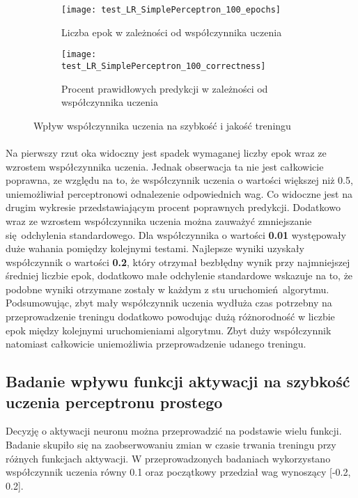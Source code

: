 \documentclass[\main/main.tex]{subfiles}
\begin{document}
    \begin{figure}[H]
    \centering
    \begin{subfigure}{.5\textwidth}
    \centering
    \texttt{[image: test\_LR\_SimplePerceptron\_100\_epochs]}
    \caption{Liczba epok w zależności od współczynnika uczenia}
    \label{fig:lr_sp_epochs}
    \end{subfigure}%
    \begin{subfigure}{.5\textwidth}
    \centering
    \texttt{[image: test\_LR\_SimplePerceptron\_100\_correctness]}
    \caption{Procent prawidłowych predykcji w zależności od współczynnika uczenia}
    \label{fig:lr_sp_correctness}
    \end{subfigure}
    \caption{Wpływ współczynnika uczenia na szybkość i jakość treningu}
    \label{fig:test}
    \end{figure}
    
    \paragraph{}
    Na pierwszy rzut oka widoczny jest spadek wymaganej liczby epok wraz ze wzrostem współczynnika uczenia. Jednak obserwacja ta nie jest całkowicie poprawna, ze względu na to, że współczynnik uczenia o wartości większej niż 0.5, uniemożliwiał perceptronowi odnalezenie odpowiednich wag. Co widoczne jest na drugim wykresie przedstawiającym procent poprawnych predykcji. Dodatkowo wraz ze wzrostem współczynnika uczenia można zauważyć zmniejszanie się odchylenia standardowego. Dla współczynnika o wartości \textbf{0.01} występowały duże wahania pomiędzy kolejnymi testami. Najlepsze wyniki uzyskały współczynnik o wartości \textbf{0.2}, który otrzymał bezbłędny wynik przy najmniejszej średniej liczbie epok, dodatkowo małe odchylenie standardowe  wskazuje na to, że podobne wyniki otrzymane zostały w każdym z stu uruchomień algorytmu. Podsumowując, zbyt mały współczynnik uczenia wydłuża czas potrzebny na przeprowadzenie treningu dodatkowo powodując dużą różnorodność w liczbie epok między kolejnymi uruchomieniami algorytmu. Zbyt duży współczynnik natomiast całkowicie uniemożliwia przeprowadzenie udanego treningu.
    
    \subsection{Badanie wpływu funkcji aktywacji na szybkość uczenia perceptronu prostego}
    Decyzję o aktywacji neuronu można przeprowadzić na podstawie wielu funkcji. Badanie skupiło się na zaobserwowaniu zmian w czasie trwania treningu przy różnych funkcjach aktywacji. W przeprowadzonych badaniach wykorzystano współczynnik uczenia równy 0.1 oraz początkowy przedział wag wynoszący [-0.2, 0.2].
    
\end{document}
